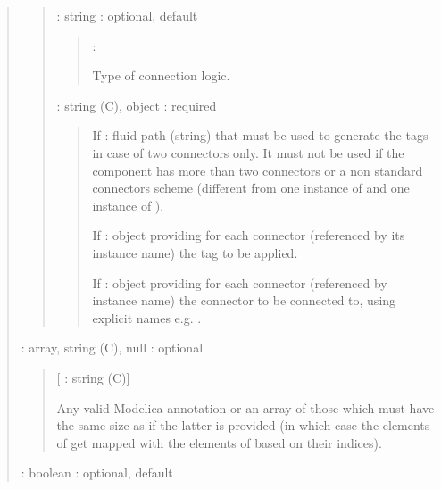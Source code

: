 \documentclass[letterpaper,10pt, openany,english]{sphinxmanual}
\begin{document}
\begin{quote}
\begin{quote}
 : string : optional, default 
\begin{quote}

 : 

Type of connection logic.
\end{quote}

 : string (C), object : required
\begin{quote}

\begin{DUlineblock}{0em}
\item[] If : fluid path (string) that must be used to generate the tags in case of two connectors only. It must not be used if the component has more than two connectors or a non standard connectors scheme (different from one instance of  and one instance of ).
\item[] If : object providing for each connector (referenced by its instance name) the tag to be applied.
\item[] If : object providing for each connector (referenced by instance name) the connector to be connected to, using explicit names e.g. .
\end{DUlineblock}
\end{quote}
\end{quote}

 : array, string (C), null : optional
\begin{quote}

{[} : string (C){]}

Any valid Modelica annotation or an array of those which must have the same size as  if the latter is provided (in which case the elements of  get mapped with the elements of  based on their indices).
\end{quote}

 : boolean : optional, default 
\begin{quote}


\end{quote}
\end{quote}
\end{document}
